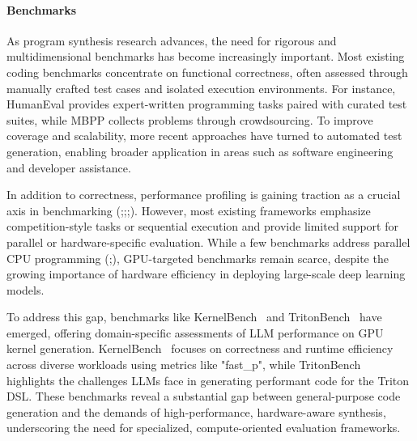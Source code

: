 \paragraph{Benchmarks}
As program synthesis research advances, the need for rigorous and multidimensional benchmarks has become increasingly important. Most existing coding benchmarks concentrate on functional correctness, often assessed through manually crafted test cases and isolated execution environments. For instance, HumanEval provides expert-written programming tasks paired with curated test suites, while MBPP\cite{austin2021programsynthesislargelanguage} collects problems through crowdsourcing. To improve coverage and scalability, more recent approaches have turned to automated test generation\cite{liu2023codegeneratedchatgptreally}, enabling broader application in areas such as software engineering and developer assistance\cite{jimenez2024swebenchlanguagemodelsresolve}.


In addition to correctness, performance profiling is gaining traction as a crucial axis in benchmarking (\cite{shypula2024learningperformanceimprovingcodeedits};\cite{liu2023codegeneratedchatgptreally};\cite{huang2025effibenchbenchmarkingefficiencyautomatically};\cite{qiu2025efficientllmgeneratedcoderigorous}). However, most existing frameworks emphasize competition-style tasks or sequential execution and provide limited support for parallel or hardware-specific evaluation. While a few benchmarks address parallel CPU programming (\cite{Nichols_2024};\cite{chaturvedi2024hpccoderv2studyingcodellms}), GPU-targeted benchmarks remain scarce, despite the growing importance of hardware efficiency in deploying large-scale deep learning models.

To address this gap, benchmarks like KernelBench~\cite{ouyang2025kernelbenchllmswriteefficient} and TritonBench~\cite{li2025tritonbenchbenchmarkinglargelanguage} have emerged, offering domain-specific assessments of LLM performance on GPU kernel generation. KernelBench~\cite{ouyang2025kernelbenchllmswriteefficient} focuses on correctness and runtime efficiency across diverse workloads using metrics like "fast\_p", while TritonBench~\cite{li2025tritonbenchbenchmarkinglargelanguage} highlights the challenges LLMs face in generating performant code for the Triton DSL. These benchmarks reveal a substantial gap between general-purpose code generation and the demands of high-performance, hardware-aware synthesis, underscoring the need for specialized, compute-oriented evaluation frameworks.

